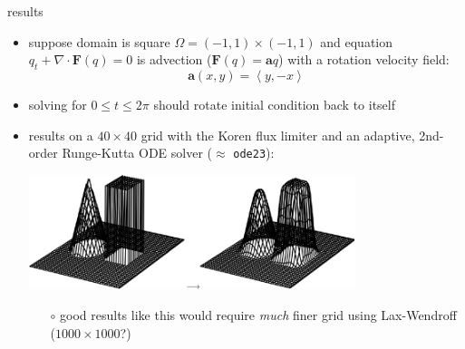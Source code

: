 \documentclass[10pt,dvipsnames,usepdftitle=false,
hyperref={pdftitle = {Finite volume methods},
    pdfauthor = {Ed Bueler}}]{beamer}
\newcommand{\ba}{\mathbf{a}}
\newcommand{\bF}{\mathbf{F}}
\newcommand{\Div}{\nabla\cdot}
\begin{document}
\begin{frame}{results}

\begin{itemize}
\item suppose domain is square $\Omega = (-1,1) \times (-1,1)$ and equation $q_t + \Div \bF(q) = 0$ is advection ($\bF(q) = \ba q$) with a rotation velocity field:
    $$\ba(x,y) = \left<y,-x\right>$$
\item solving for $0\le t \le 2\pi$ should rotate initial condition back to itself
\item results on a $40\times 40$ grid with the Koren flux limiter and an adaptive, 2nd-order Runge-Kutta ODE solver ($\approx$ \texttt{ode23}):

\bigskip
\hfill \includegraphics[width=0.75\textwidth]{figs/bueler11p7}

\medskip
    \begin{itemize}
    \item[$\circ$] good results like this would require \emph{much} finer grid using Lax-Wendroff ($1000\times 1000$?)
    \end{itemize}
\end{itemize}
\end{frame}
\end{document}
